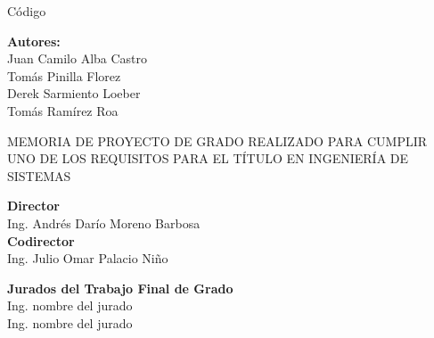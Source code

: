 \setcounter{page}{1}

    \begin{center}

        \large
        Código \\

        \vspace{0.5cm}
        \LARGE
        
        \large
        \thetitle
        
        \vspace{0.5cm}
        \LARGE


        \vspace{0.3cm}

        \large
        \textbf{Autores:}\\
        \vspace{0.2cm}
        Juan Camilo Alba Castro \\
        Tomás Pinilla Florez \\
        Derek Sarmiento Loeber \\
        Tomás Ramírez Roa \\
        
        \vspace{0.3cm}
        \LARGE


        \large
        \vspace{0.3cm}
         MEMORIA DE PROYECTO DE GRADO REALIZADO PARA CUMPLIR UNO DE LOS REQUISITOS PARA EL TÍTULO EN INGENIERÍA DE SISTEMAS \\

        \vspace{0.3cm}
        \LARGE


        \vspace{0.3cm}

        \large
        \textbf{Director}\\
        \vspace{0.2cm}
        Ing. Andrés Darío Moreno Barbosa\\
        \vspace{0.2cm}
        \textbf{Codirector}\\
        \vspace{0.2cm}
        Ing. Julio Omar Palacio Niño\\

        \vspace{0.3cm}
        \LARGE


        \vspace{0.3cm}

        \large
        \textbf{Jurados del Trabajo Final de Grado}\\
        \vspace{0.2cm}
        Ing. nombre del jurado\\
        Ing. nombre del jurado \\


\end{center}
